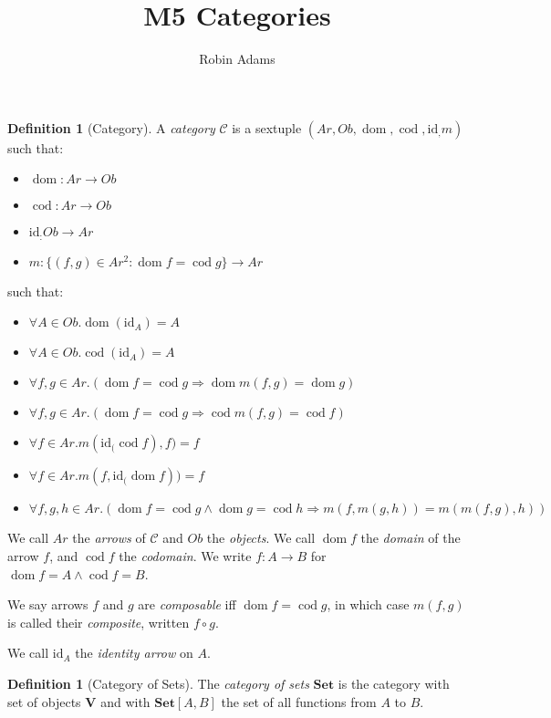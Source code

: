 \documentclass{article}
\title{M5 Categories}
\author{Robin Adams}
\theoremstyle{definition}
\newtheorem{definition}[axiom]{Definition}
\newcommand{\id}[1]{\ensuremath{\mathrm{id}_{#1}}}
\newcommand{\dom}{\ensuremath{\operatorname{dom}}}
\newcommand{\cod}{\ensuremath{\operatorname{cod}}}
\begin{document}
\maketitle

\begin{definition}[Category]
    A \emph{category} $\mathcal{C}$ is a sextuple $(Ar, Ob, \dom, \cod, \id, m)$ such
    that:
    \begin{itemize}
        \item $\dom : Ar \rightarrow Ob$
        \item $\cod : Ar \rightarrow Ob$
        \item $\id : Ob \rightarrow Ar$
        \item $m : \{ (f,g) \in Ar^2 : \dom f = \cod g \} \rightarrow Ar$
    \end{itemize}
    such that:
    \begin{itemize}
        \item $\forall A \in Ob. \dom (\id A) = A$
        \item $\forall A \in Ob. \cod (\id A) = A$
        \item $\forall f,g \in Ar. (\dom f = \cod g \Rightarrow \dom m(f,g) = \dom g)$
        \item $\forall f,g \in Ar. (\dom f = \cod g \Rightarrow \cod m(f,g) = \cod f)$
        \item $\forall f \in Ar. m(\id (\cod f), f) = f$
        \item $\forall f \in Ar. m(f, \id (\dom f)) = f$
        \item $\forall f,g,h \in Ar. (\dom f = \cod g \wedge \dom g = \cod h
        \Rightarrow m(f,m(g,h)) = m(m(f,g),h))$
    \end{itemize}
    We call $Ar$ the \emph{arrows} of $\mathcal{C}$ and $Ob$ the \emph{objects}.
    We call $\dom f$ the \emph{domain} of the arrow $f$, and $\cod f$ the
    \emph{codomain}. We write $f : A \rightarrow B$ for $\dom f = A \wedge \cod f = B$.

    We say arrows $f$ and $g$ are \emph{composable} iff $\dom f = \cod g$, in which
    case $m(f,g)$ is called their \emph{composite}, written $f \circ g$.

    We call $\id A$ the \emph{identity arrow} on $A$.
\end{definition}

\begin{definition}[Category of Sets]
    The \emph{category of sets} $\mathbf{Set}$ is the category with set of objects
    $\mathbf{V}$ and with $\mathbf{Set}[A,B]$ the set of all functions from $A$ to $B$.
\end{definition}
\end{document}
